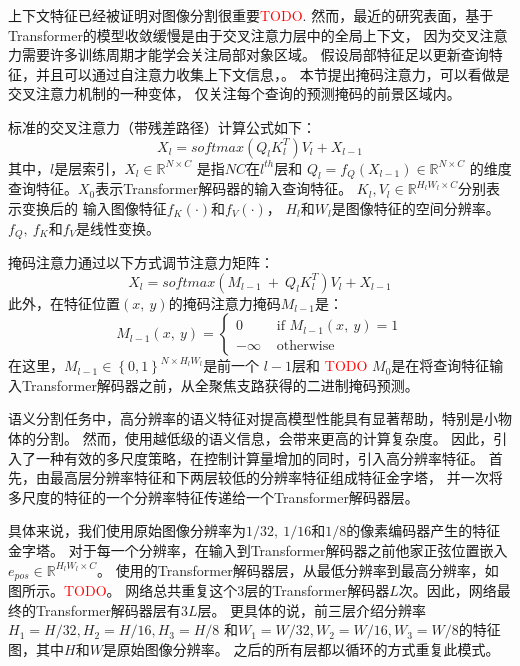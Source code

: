 %
%
\label{chap:part4_view_enh}
% 
% 
% 
% 
上下文特征已经被证明对图像分割很重要\textcolor{red}{TODO}.
然而，最近的研究表面，基于Transformer的模型收敛缓慢是由于交叉注意力层中的全局上下文，
因为交叉注意力需要许多训练周期才能学会关注局部对象区域。
假设局部特征足以更新查询特征，并且可以通过自注意力收集上下文信息，。
本节提出掩码注意力，可以看做是交叉注意力机制的一种变体，
仅关注每个查询的预测掩码的前景区域内。
\par
% 
% 
% 
% 
标准的交叉注意力（带残差路径）计算公式如下：
\begin{equation}
	X_{l}=softmax(Q_{l}K_{l}^{T})V_{l} + X_{l-1}
\end{equation}
其中，$l$是层索引，$X_{l} \in \mathbb{R}^{N\times C}$
是指$NC$在$l^{th}$层和
$ Q_{l} = f_{Q} \left ( X_{l-1} \right ) \in \mathbb{R}^{N \times C} $
的维度查询特征。$X_{0}$表示Transformer解码器的输入查询特征。
$K_{l},V_{l} \in \mathbb{R}^{H_{l}W_{l} \times C}$分别表示变换后的
输入图像特征$f_{K}(\cdot) $和$ f_{V}( \cdot )$，
$H_{l}$和$W_{l}$是图像特征的空间分辨率。
$f_{Q},~f_{K} $和$ f_{V} $是线性变换。
\par
% 
% 
% 
% 
掩码注意力通过以下方式调节注意力矩阵：
\begin{equation}
	X_{l}=softmax(M_{l-1} ~+~Q_{l}K_{l}^{T})V_{l} + X_{l-1}
\end{equation}
% 
% 
此外，在特征位置$(x,~y)$的掩码注意力掩码$M_{l-1}$是：
\begin{equation}
	M_{l-1}(x,~y)=\begin{cases}
		0  & \text{ if } M_{l-1}(x,~y)= 1\\
		-\infty & \text{ otherwise } 
	  \end{cases}
\end{equation}
% 
% 
在这里，$M_{l-1} \in \left \{  0,1\right \} ^{N \times H_{l}W_{l}} $是前一个
$l-1$层和
\textcolor{red}{TODO}
$M_{0}$是在将查询特征输入Transformer解码器之前，从全聚焦支路获得的二进制掩码预测。
\par
% 
% 
% 
% 
语义分割任务中，高分辨率的语义特征对提高模型性能具有显著帮助，特别是小物体的分割。
然而，使用越低级的语义信息，会带来更高的计算复杂度。
因此，引入了一种有效的多尺度策略，在控制计算量增加的同时，引入高分辨率特征。
首先，由最高层分辨率特征和下两层较低的分辨率特征组成特征金字塔，
并一次将多尺度的特征的一个分辨率特征传递给一个Transformer解码器层。
\par
% 
% 
% 
% 
具体来说，我们使用原始图像分辨率为$1/32,~1/16$和$1/8$的像素编码器产生的特征金字塔。
对于每一个分辨率，在输入到Transformer解码器之前他家正弦位置嵌入
$ e_{pos}\in \mathbb{R}^{H_{l}W_{l}\times C} $。
使用的Transformer解码器层，从最低分辨率到最高分辨率，如图所示。\textcolor{red}{TODO}。
网络总共重复这个3层的Transformer解码器$L$次。因此，网络最终的Transformer解码器层有$3L$层。
更具体的说，前三层介绍分辨率$H_{1}=H/32,H_{2}=H/16,H_{3}=H/8$
和$W_{1}=W/32,W_{2}=W/16,W_{3}=W/8$的特征图，其中$H$和$W$是原始图像分辨率。
之后的所有层都以循环的方式重复此模式。

